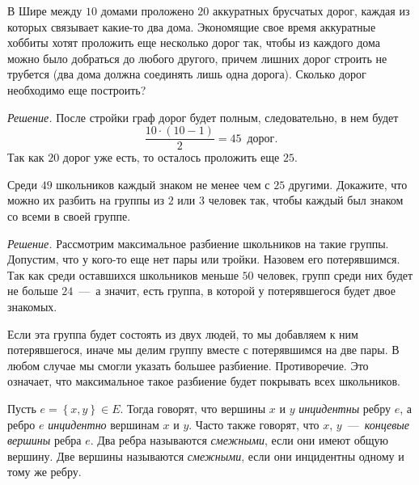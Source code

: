 \begin{example}
	В Шире между $10$ домами проложено $20$ аккуратных брусчатых дорог, каждая из которых связывает какие-то два дома. 
	Экономящие свое время аккуратные хоббиты хотят проложить еще несколько дорог так, чтобы из каждого дома можно было 
	добраться до любого другого, причем лишних дорог строить не трубется (два дома должна соединять лишь одна дорога). 
	Сколько дорог необходимо еще построить?
	
	\emph{Решение.} После стройки граф дорог будет полным, следовательно, в нем будет 
	$$\frac{10 \cdot (10-1)}{2} = 45 \;\ \text{дорог}.$$
	Так как $20$ дорог уже есть, то осталось проложить еще $25$.
\end{example}

\begin{example}
	Среди $49$ школьников каждый знаком не менее чем с $25$ другими. Докажите, что можно их разбить на группы из $2$ или 
	$3$ человек так, чтобы каждый был знаком со всеми в своей группе.
	
	\emph{Решение.} Рассмотрим максимальное разбиение школьников на такие группы. Допустим, что у кого-то еще нет пары или тройки. 
	Назовем его потерявшимся. Так как среди оставшихся школьников меньше $50$ человек, групп среди них будет не больше $24$~---~а 
	значит, есть группа, в которой у потерявшегося будет двое знакомых.
	
	Если эта группа будет состоять из двух людей, то мы добавляем к ним потерявшегося, иначе мы делим группу вместе с потерявшимся 
	на две пары. В любом случае мы смогли указать большее разбиение. Противоречие. Это означает, что максимальное такое 
	разбиение будет покрывать всех школьников.
\end{example}


\begin{definition}
	Пусть $e = \left\lbrace x, y \right\rbrace \in E$. Тогда говорят, что вершины $x$ и $y$ \emph{инцидентны} ребру $e$, 
	а ребро $e$ \emph{инцидентно} вершинам $x$ и $y$. Часто также говорят, что $x$, $y$~---~\emph{концевые вершины} ребра $e$. 
	Два ребра называются \emph{смежными}, если они имеют общую вершину. Две вершины называются \emph{смежными}, 
	если они инцидентны одному и тому же ребру.
\end{definition}


